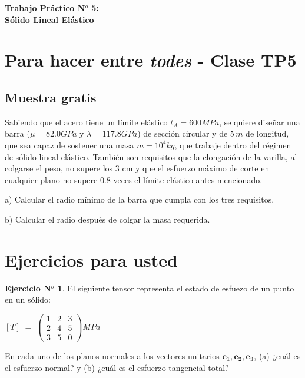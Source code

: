 \documentclass[12pt,a4paper]{article}
\theoremstyle{definition}
\newtheorem{theorem}{Ejercicio N$^o$}
\begin{document}
\begin{center}
\textbf{Trabajo Práctico N$^o$ 5: \\ Sólido Lineal Elástico}
\end{center}

\medskip

\section{Para hacer entre \textit{todes} - Clase TP5}
\subsection*{Muestra gratis}
Sabiendo que el acero tiene un límite elástico $t_A = 600 MPa$, se quiere diseñar una barra ($\mu = 82.0 GPa$ y $\lambda = 117.8 GPa$) de sección circular y de $5\, m$ de longitud, que sea capaz de sostener una masa $m=10^4 kg$, que trabaje dentro del régimen de sólido lineal elástico. También son requisitos que la elongación  de la varilla, al colgarse el peso, no supere los 3 cm y que el esfuerzo máximo de corte en cualquier plano no supere $0.8$ veces el límite elástico antes mencionado.

\vspace{0.25cm}

\noindent a) Calcular el radio mínimo de la barra que cumpla con los tres requisitos.

\noindent b) Calcular el radio después de colgar la masa requerida.


\section{Ejercicios para usted}
 \begin{theorem}
El siguiente tensor representa el estado de esfuezo de un punto en un sólido: 
 
 \begin{center}
$[T] \; = \;
\left(\begin{smallmatrix}
1 & 2 & 3\\
2 & 4 & 5\\
3 & 5 & 0
\end{smallmatrix}\right)
MPa
$
 \end{center}

En cada uno de los planos normales a los vectores unitarios $\mathbf{e_1, e_2, e_3}$, (a) ¿cuál es el esfuerzo normal? y (b) ¿cuál es el esfuerzo tangencial total?

\end{theorem}
\end{document}
